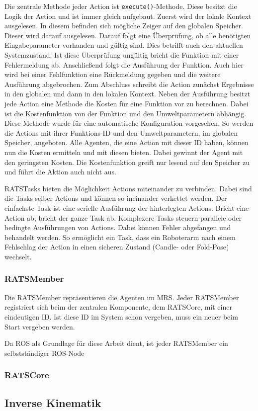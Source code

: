 Die zentrale Methode jeder Action ist  \lstinline|execute()|-Methode. Diese besitzt die Logik der Action und ist immer gleich aufgebaut. Zuerst wird der lokale Kontext ausgelesen. In diesem befinden sich mögliche Zeiger auf den globalen Speicher. Dieser wird darauf ausgelesen. Darauf folgt eine Überprüfung, ob alle benötigten Eingabeparameter vorhanden und gültig sind. Dies betrifft auch den aktuellen Systemzustand. Ist diese Überprüfung ungültig bricht die Funktion mit einer Fehlermeldung ab. Anschließend folgt die Ausführung der Funktion. Auch hier wird bei einer Fehlfunktion eine Rückmeldung gegeben und die weitere Ausführung abgebrochen. Zum Abschluss schreibt die Action zunächst Ergebnisse in den globalen und dann in den lokalen Kontext. Neben der Ausführung besitzt jede Action eine Methode die Kosten für eine Funktion vor zu berechnen. Dabei ist die Kostenfunktion von der Funktion und den Umweltparametern abhängig. Diese Methode wurde für eine automatische Konfiguration vorgesehen. So werden die Actions mit ihrer Funktions-ID und den Umweltparametern, im globalen Speicher, angeboten. Alle Agenten, die eine Action mit dieser ID haben, können nun die Kosten ermitteln und mit diesen bieten. Dabei gewinnt der Agent mit den geringsten Kosten. Die Kostenfunktion greift nur lesend auf den Speicher zu und führt die Aktion auch nicht aus.

RATSTasks bieten die Möglichkeit Actions miteinander zu verbinden. Dabei sind die Tasks selber Actions und können so ineinander verkettet werden. Der einfachste Task ist eine serielle Ausführung der hinterlegten Actions. Bricht eine Action ab, bricht der ganze Task ab. Komplexere Tasks steuern parallele oder bedingte Ausführungen von Actions. Dabei können Fehler abgefangen und behandelt werden. So ermöglicht ein Task, dass ein Roboterarm nach einem Fehlschlag der Action in einen sicheren Zustand (Candle- oder Fold-Pose) wechselt.


\subsubsection{RATSMember}
Die RATSMember repräsentieren die Agenten im MRS. Jeder RATSMember registriert sich beim der zentralen Komponente, dem RATSCore, mit einer eindeutigen ID. Ist diese ID im System schon vergeben, muss ein neuer beim Start vergeben werden.

Da ROS als Grundlage für diese Arbeit dient, ist jeder RATSMember ein selbstständiger ROS-Node
\subsubsection{RATSCore}




\subsection{Inverse Kinematik}

